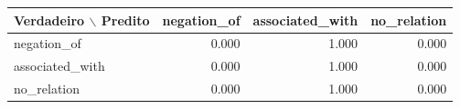 \begin{tabular}{lrrr}
\toprule
Verdadeiro $\backslash$ Predito & negation\_of & associated\_with & no\_relation \\
\midrule
negation\_of & 0.000 & 1.000 & 0.000 \\
associated\_with & 0.000 & 1.000 & 0.000 \\
no\_relation & 0.000 & 1.000 & 0.000 \\
\bottomrule
\end{tabular}
